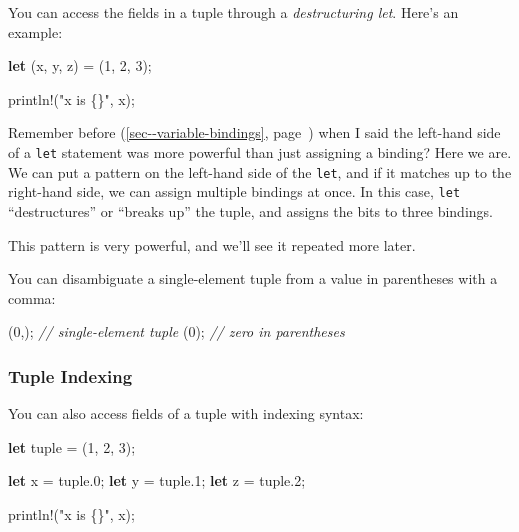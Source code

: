 \documentclass[a4paper,]{book}
\renewcommand*{\hyperref}[2][\ar]{%
  \def\ar{#2}%
  #2 (\autoref{#1}, page~\pageref{#1})}
\newenvironment{Shaded}{\begin{snugshade}}{\end{snugshade}}
\newcommand{\KeywordTok}[1]{\textcolor[rgb]{0.13,0.29,0.53}{\textbf{{#1}}}}
\newcommand{\DecValTok}[1]{\textcolor[rgb]{0.00,0.00,0.81}{{#1}}}
\newcommand{\StringTok}[1]{\textcolor[rgb]{0.31,0.60,0.02}{{#1}}}
\newcommand{\CommentTok}[1]{\textcolor[rgb]{0.56,0.35,0.01}{\textit{{#1}}}}
\newcommand{\OtherTok}[1]{\textcolor[rgb]{0.56,0.35,0.01}{{#1}}}
\newcommand{\NormalTok}[1]{{#1}}
\begin{document}
You can access the fields in a tuple through a \emph{destructuring let}.
Here's an example:

\begin{Shaded}
\begin{Highlighting}[]
\KeywordTok{let} \NormalTok{(x, y, z) = (}\DecValTok{1}\NormalTok{, }\DecValTok{2}\NormalTok{, }\DecValTok{3}\NormalTok{);}

\OtherTok{println!}\NormalTok{(}\StringTok{"x is \{\}"}\NormalTok{, x);}
\end{Highlighting}
\end{Shaded}

Remember \hyperref[sec--variable-bindings]{before} when I said the
left-hand side of a \texttt{let} statement was more powerful than just
assigning a binding? Here we are. We can put a pattern on the left-hand
side of the \texttt{let}, and if it matches up to the right-hand side,
we can assign multiple bindings at once. In this case, \texttt{let}
``destructures'' or ``breaks up'' the tuple, and assigns the bits to
three bindings.

This pattern is very powerful, and we'll see it repeated more later.

You can disambiguate a single-element tuple from a value in parentheses
with a comma:

\begin{Shaded}
\begin{Highlighting}[]
\NormalTok{(}\DecValTok{0}\NormalTok{,); }\CommentTok{// single-element tuple}
\NormalTok{(}\DecValTok{0}\NormalTok{); }\CommentTok{// zero in parentheses}
\end{Highlighting}
\end{Shaded}

\subsubsection{Tuple Indexing}\label{tuple-indexing}

You can also access fields of a tuple with indexing syntax:

\begin{Shaded}
\begin{Highlighting}[]
\KeywordTok{let} \NormalTok{tuple = (}\DecValTok{1}\NormalTok{, }\DecValTok{2}\NormalTok{, }\DecValTok{3}\NormalTok{);}

\KeywordTok{let} \NormalTok{x = tuple.}\DecValTok{0}\NormalTok{;}
\KeywordTok{let} \NormalTok{y = tuple.}\DecValTok{1}\NormalTok{;}
\KeywordTok{let} \NormalTok{z = tuple.}\DecValTok{2}\NormalTok{;}

\OtherTok{println!}\NormalTok{(}\StringTok{"x is \{\}"}\NormalTok{, x);}
\end{Highlighting}
\end{Shaded}
\end{document}

